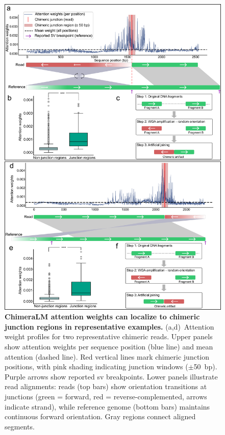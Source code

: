 \documentclass[pdflatex,sn-nature,lineno]{sn-jnl}%
\theoremstyle{thmstyleone}%
\theoremstyle{thmstyletwo}%
\theoremstyle{thmstylethree}%
\begin{document}
\begin{figure}[H]
	\begin{center}
		\includegraphics[width=\textwidth]{final_figures/figure4}
	\end{center}
	\caption{{\bf ChimeraLM attention weights can localize to chimeric junction regions in representative examples.}
		(a,d)~Attention weight profiles for two representative chimeric reads. Upper panels show attention weights per sequence position (blue line) and mean attention (dashed line). Red vertical lines mark chimeric junction positions, with pink shading indicating junction windows ($\pm$50~bp). Purple arrows show reported \gls{sv} breakpoints. Lower panels illustrate read alignments: reads (top bars) show orientation transitions at junctions (green = forward, red = reverse-complemented, arrows indicate strand), while reference genome (bottom bars) maintains continuous forward orientation. Gray regions connect aligned segments.
}
\end{figure}
\end{document}
